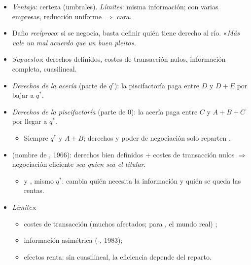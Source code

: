 \documentclass{article}
\begin{document}
\begin{columnas}
\begin{itemize}
\begin{itemize}
  \item Acería $A+B+C$: $B+C$ es  (sin recaudación).
  \end{itemize}
\item \emph{Ventaja}: certeza (umbrales). \emph{Límites}: misma información; con varias empresas, reducción uniforme $\Rightarrow$ cara.
\end{itemize}
\begin{itemize}
\item Daño \emph{recíproco}: si se negocia, basta definir quién tiene derecho al río. «\emph{Más vale un mal acuerdo que un buen pleito}».
\item \emph{Supuestos}: derechos definidos, costes de transacción nulos, información completa, cuasilineal.
\item \emph{Derechos de la acería} (parte de $q^c$): la piscifactoría paga entre $D$ y $D+E$ por bajar a $q^*$.
\item \emph{Derechos de la piscifactoría} (parte de 0): la acería paga entre $C$ y $A+B+C$ por llegar a $q^*$.
  \begin{itemize}
  \item Siempre $q^*$ y $A+B$; derechos y poder de negociación solo reparten .
  \end{itemize}
\end{itemize}
\begin{itemize}
\item {} (nombre de , 1966): derechos bien definidos + costes de transacción nulos $\Rightarrow$ negociación eficiente \emph{sea quien sea el titular}.
  \begin{itemize}
  \item {} y , mismo $q^*$: cambia quién necesita la información y quién se queda las rentas.
  \end{itemize}
\item \emph{Límites}:
  \begin{itemize}
  \item costes de transacción (muchos afectados; para , el mundo real) ;
  \item información asimétrica (-, 1983);
  \item efectos renta: sin cuasilineal, la eficiencia depende del reparto.

\end{itemize}
\end{itemize}
\end{columnas}
\end{document}
